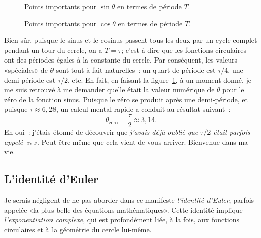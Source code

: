 \begin{figure}
\begin{center}
\end{center}
\caption{Points importants pour $\sin\theta$ en termes de période
$T$.\label{fig:sine_with_tau}}
\end{figure}

\begin{figure}
\begin{center}
\end{center}
\caption{Points importants pour $\cos\theta$ en termes de période
$T$.\label{fig:cosine_with_tau}}
\end{figure}

Bien sûr, puisque le sinus et le cosinus passent tous les deux par un cycle
complet pendant un tour du cercle, on a $T = \tau$\ns; c'est-à-dire que les
fonctions circulaires ont des périodes égales à la constante du cercle. Par
conséquent, les valeurs «\ns spéciales\ns »  de $\theta$ sont tout à fait
naturelles~: un quart de période est $\tau/4$, une demi-période est $\tau/2$,
etc. En fait, en faisant la figure~\ref{fig:sine_with_tau}, à un moment donné,
je me suis retrouvé à me demander quelle était la valeur numérique de $\theta$
pour le zéro de la fonction sinus. Puisque le zéro se produit après une
demi-période, et puisque $\tau \approx 6{,}28$, un calcul mental rapide a
conduit au résultat suivant~:
\[
  \theta_\mathrm{zéro} = \frac{\tau}{2} \approx 3{,}14.
\]
Eh oui~: j'étais étonné de découvrir que \emph{j'avais déjà oublié que
$\tau/2$ était parfois appelé «\ns $\pi$\ns »}. Peut-être même que cela vient de vous
arriver. Bienvenue dans ma vie.



   \subsection{L'identité d'Euler} %
   \label{sec:euler_s_identity}

Je serais négligent de ne pas aborder dans ce manifeste \emph{l'identité
d'Euler}, parfois appelée «\ns la plus belle des équations mathématiques\ns ». Cette
identité implique \emph{l'exponentiation complexe}, qui est profondément liée, à
la fois, aux fonctions circulaires et à la géométrie du cercle lui-même.

